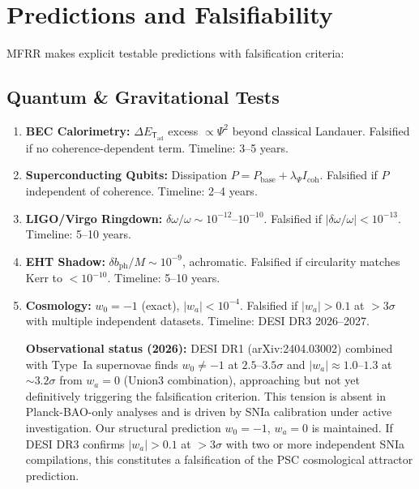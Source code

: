 \documentclass[11pt]{article}
\newcommand{\Trans}{\ensuremath{{\mathsf{T}_{\mathrm{ad}}}}}
\begin{document}
\section{Predictions and Falsifiability}

MFRR makes explicit testable predictions with falsification criteria:

\subsection{Quantum \& Gravitational Tests}
\begin{enumerate}[leftmargin=1.5em,label=\arabic*.]
\item \textbf{BEC Calorimetry:} $\Delta E_\Trans$ excess $\propto\Psi^2$ beyond classical Landauer. Falsified if no coherence-dependent term. Timeline: 3--5 years.
\item \textbf{Superconducting Qubits:} Dissipation $P=P_\mathrm{base}+\lambda_\Psi I_\mathrm{coh}$. Falsified if $P$ independent of coherence. Timeline: 2--4 years.
\item \textbf{LIGO/Virgo Ringdown:} $\delta\omega/\omega\sim10^{-12}$--$10^{-10}$. Falsified if $|\delta\omega/\omega|<10^{-13}$. Timeline: 5--10 years.
\item \textbf{EHT Shadow:} $\delta b_\mathrm{ph}/M\sim10^{-9}$, achromatic. Falsified if circularity matches Kerr to $<10^{-10}$. Timeline: 5--10 years.
\item \textbf{Cosmology:} $w_0=-1$ (exact), $|w_a|<10^{-4}$. Falsified if $|w_a|>0.1$ at $>3\sigma$ with multiple independent datasets. Timeline: DESI DR3 2026--2027.

\textbf{Observational status (2026):} DESI DR1 (arXiv:2404.03002) combined with Type~Ia supernovae finds $w_0\neq-1$ at $2.5$--$3.5\sigma$ and $|w_a|\approx1.0$--$1.3$ at ${\sim}3.2\sigma$ from $w_a=0$ (Union3 combination), approaching but not yet definitively triggering the falsification criterion. This tension is absent in Planck-BAO-only analyses and is driven by SNIa calibration under active investigation. Our structural prediction $w_0=-1$, $w_a=0$ is maintained. If DESI DR3 confirms $|w_a|>0.1$ at $>3\sigma$ with two or more independent SNIa compilations, this constitutes a falsification of the PSC cosmological attractor prediction.
\end{enumerate}
\end{document}
